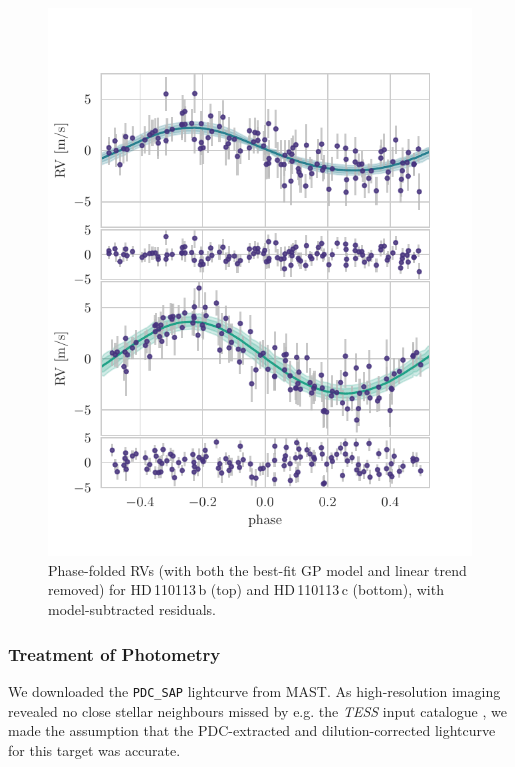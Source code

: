 \documentclass[fleqn,usenatbib]{mnras}
\newcommand{\tess}{{\it TESS}}
\newcommand{\Tplanet}{HD\,110113\,b}
\newcommand{\Tplanetc}{HD\,110113\,c}
\begin{document}
\begin{figure}
	\includegraphics[width=\columnwidth, trim={0.1cm 0.8cm 1.0cm 0.85cm}]{Phase_folded_RV_plots_3_GPs_nontransiting_c.pdf}
    \caption{Phase-folded RVs (with both the best-fit GP model and linear trend removed) for \Tplanet{} (top) and \Tplanetc{} (bottom), with model-subtracted residuals. }
    \label{fig:phase_fold_rvs}
\end{figure}

\subsubsection{Treatment of Photometry}
We downloaded the \texttt{PDC\_SAP} lightcurve from MAST.
As high-resolution imaging revealed no close stellar neighbours missed by e.g. the \tess{} input catalogue \citep{stassun2019revised}, we made the assumption that the PDC-extracted and dilution-corrected lightcurve for this target was accurate.
\end{document}
